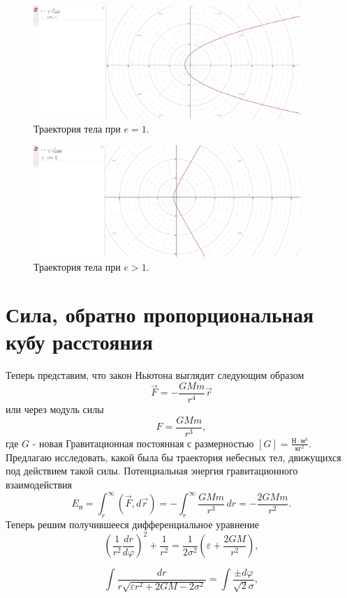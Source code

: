 \documentclass[a4paper]{article}
\begin{document}
\begin{figure}[h!]
    \centering
    \includegraphics[width=0.9\textwidth]{Parabola1.jpg}
    \caption{Траектория тела при $e = 1$.}
    \clearpage
\end{figure}
\clearpage
\begin{figure}[h!]
    \centering
    \includegraphics[width=0.9\textwidth]{Hyperbola1.jpg}
    \caption{Траектория тела при $e > 1$.}
\end{figure}

\section{Сила, обратно пропорциональная кубу расстояния}
Теперь представим, что закон Ньютона выглядит следующим образом
\[
\vec{F} = -\frac{GMm} {r^4} \vec{r}
\]
или через модуль силы
\[
F = \frac{GMm} {r^3},
\]
где $G$ - новая Гравитационная постоянная с размерностью $[G] = \frac{\text{Н} \cdot \text{м}^3}{\text{кг}^2}$. Предлагаю исследовать, какой была бы траектория небесных тел, движущихся под действием такой силы.
Потенциальная энергия гравитационного взаимодействия
\[
E_{\text{п}} = \int_{r}^{\infty}{(\vec{F} , d\vec{r})} = -\int_{r}^{\infty}{\frac{GMm}{r^3} \, dr} = -\frac{2GMm}{r^2}.
\]
Теперь решим получившееся дифференциальное уравнение
\[
(\frac{1}{r^2}\frac{dr}{d\varphi})^2 + \frac{1}{r^2} = \frac{1}{2\sigma^2}(\varepsilon + \frac{2GM}{r^2}),
\]

\[
\int{\frac{dr}{r\sqrt{\varepsilon r^2 + 2GM - 2\sigma^2}}} = \int{\frac{\pm d\varphi}{\sqrt{2}\sigma}},
\]
\end{document}
